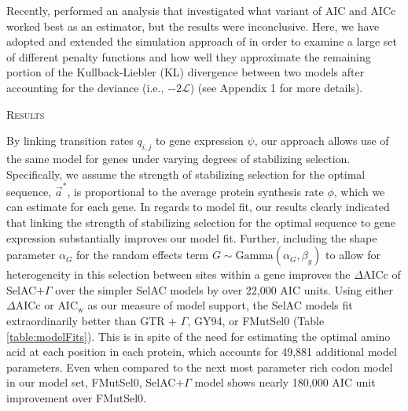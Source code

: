 \documentclass[12pt,letterpaper]{article}
\renewcommand{\section}[1]{%
\bigskip
\begin{center}
\begin{Large}
\normalfont\scshape #1
\medskip
\end{Large}
\end{center}}
\newcommand{\DeltaAICc}{\ensuremath{\Delta\text{AICc}}\xspace}
\newcommand{\AICw}{\ensuremath{\text{AIC}_\text{w}}\xspace}
\newcommand{\Lik}{\ensuremath{\mathcal{L}}\xspace}%
\newcommand{\selac}{SelAC\xspace}
\newcommand{\selacplusgamma}{SelAC$+\Gamma$\xspace}
\newcommand{\alphag}{\ensuremath{\alpha_G}\xspace}
\newcommand{\aoptvec}{\ensuremath{\Vec{a}^*}\xspace}
\newcommand{\qij}{\ensuremath{q_{i,j}}\xspace}
\begin{document}
Recently, \citet{Jhwuengetal2014} performed an analysis that investigated what variant of AIC and AICc worked best as an estimator, but the results were inconclusive.
Here, we have adopted and extended the simulation approach of \citet{Jhwuengetal2014} in order to examine a large set of different penalty functions and how well they approximate the remaining portion of the Kullback-Liebler (KL) divergence between two models after accounting for the deviance (i.e., $-2\Lik$) (see Appendix 1 for more details).


\section{Results}
By linking transition rates $\qij$ to gene expression $\psi$, our approach allows use of the same model for genes under varying degrees of stabilizing selection.
Specifically, we assume the strength of stabilizing selection for the optimal sequence, \aoptvec, is proportional to the average protein synthesis rate $\phi$, which we can estimate for each gene.
In regards to model fit, our results clearly indicated that linking the strength of stabilizing selection for the optimal sequence to gene expression substantially improves our model fit.
Further, including the shape parameter \alphag for the random effects term $G \sim \text{Gamma}(\alphag, \beta_g)$ to allow for heterogeneity in this selection between sites within a gene improves the \DeltaAICc of \selacplusgamma over the simpler \selac models by over 22,000 AIC units.
Using either \DeltaAICc or \AICw as our measure of model support, the \selac models fit extraordinarily better than GTR + $\Gamma$, GY94, or FMutSel0 (Table \ref{table:modelFits}).
This is in spite of the need for estimating the optimal amino acid at each position in each protein, which accounts for 49,881 additional model parameters.
Even when compared to the next most parameter rich codon model in our model set, FMutSel0, \selacplusgamma model shows nearly 180,000 AIC unit improvement over FMutSel0.
\end{document}
